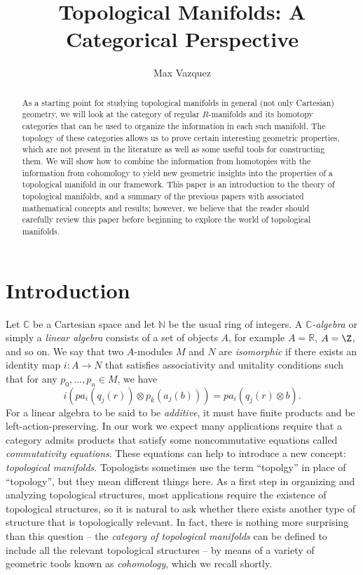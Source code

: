 \documentclass[a4paper,reqno,oneside]{article}
\begin{document}
\title{Topological Manifolds: A Categorical Perspective}
\author{Max Vazquez}
\maketitle


\begin{abstract}
As a starting point for studying topological manifolds in general (not only Cartesian) geometry, we will look at the category of regular $R$-manifolds and its homotopy categories that can be used to organize the information in each such manifold. The topology of these categories allows us to prove certain interesting geometric properties, which are not present in the literature as well as some useful tools for constructing them.
We will show how to combine the information from homotopies with the information from cohomology to yield new geometric insights into the properties of a topological manifold in our framework. This paper is an introduction to the theory of topological manifolds, and a summary of the previous papers with associated mathematical concepts and results; however, we believe that the reader should carefully review this paper before beginning to explore the world of topological manifolds.
\end{abstract}


\section*{Introduction} \label{sec:intro}

Let $\mathbb C$ be a Cartesian space and let $\mathbb N$ be the usual ring of integers. A \emph{$\mathbb C$-algebra} or simply a \emph{linear algebra} consists of a set of objects $A$, for example $A=\mathbb R$, $A=\Z$, and so on. We say that two $A$-modules $M$ and $N$ are \emph{isomorphic} if there exists an identity map $i:A\to N$ that satisfies associativity and unitality conditions such that for any $p_0,\dots,p_n\in M$, we have
\[
i(pa_{i}(q_{j}(r))\otimes p_{k}(a_{j}(b)))=pa_{i}(q_{j}(r)\otimes b).
\]
For a linear algebra to be said to be \emph{additive}, it must have finite products and be left-action-preserving. In our work we expect many applications require that a category admits products that satisfy some noncommutative equations called \emph{commutativity equations}. These equations can help to introduce a new concept: \emph{topological manifolds}. Topologists sometimes use the term ``topolgy'' in place of ``topology'', but they mean different things here. As a first step in organizing and analyzing topological structures, most applications require the existence of topological structures, so it is natural to ask whether there exists another type of structure that is topologically relevant. In fact, there is nothing more surprising than this question -- the \emph{category of topological manifolds} can be defined to include all the relevant topological structures -- by means of a variety of geometric tools known as \emph{cohomology}, which we recall shortly. 
\end{document}
